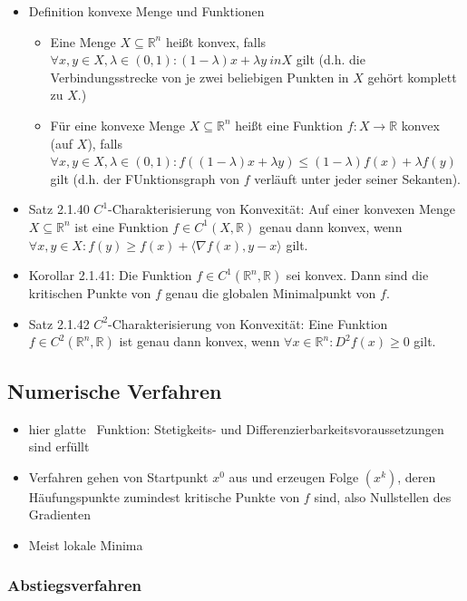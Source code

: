 \documentclass[paper=a4, fontsize=11pt]{scrartcl} %
\numberwithin{equation}{section} %
\numberwithin{figure}{section} %
\numberwithin{table}{section} %
\begin{document}
\begin{itemize}
\item Definition konvexe Menge und Funktionen
\begin{itemize}
\item Eine Menge $X \subseteq \mathbb{R}^n$ heißt konvex, falls $\forall x,y \in X, \lambda \in (0,1): (1-\lambda)x + \lambda y \ in X$ gilt (d.h. die Verbindungsstrecke von je zwei beliebigen Punkten in $X$ gehört komplett zu $X$.)
\item Für eine konvexe Menge $X \subseteq \mathbb{R}^n$ heißt eine Funktion $f: X \rightarrow \mathbb{R}$ konvex (auf $X$), falls $\forall x,y \in X, \lambda \in (0,1): f((1-\lambda)x+\lambda y) \le (1-\lambda)f(x) + \lambda f(y)$ gilt (d.h. der FUnktionsgraph von $f$ verläuft unter jeder seiner Sekanten).
\end{itemize}
\item Satz 2.1.40 $C^1$-Charakterisierung von Konvexität: Auf einer konvexen Menge $X \subseteq \mathbb{R}^n$ ist eine Funktion $f \in C^1(X,\mathbb{R})$ genau dann konvex, wenn $\forall x,y \in X: f(y) \ge f(x) + \langle \nabla f(x),y-x\rangle$ gilt.
\item Korollar 2.1.41: Die Funktion $f \in C^1(\mathbb{R}^n,\mathbb{R})$ sei konvex. Dann sind die kritischen Punkte von $f$ genau die globalen Minimalpunkt von $f$.
\item Satz 2.1.42 $C^2$-Charakterisierung von Konvexität: Eine Funktion $f \in C^2(\mathbb{R}^n,\mathbb{R})$ ist genau dann konvex, wenn $\forall x \in \mathbb{R}^n: D^2f(x) \ge 0$ gilt.
\end{itemize}

\subsection{Numerische Verfahren}

\begin{itemize}
\item hier \glqq glatte \grqq\ Funktion: Stetigkeits- und Differenzierbarkeitsvoraussetzungen sind erfüllt
\item Verfahren gehen von Startpunkt $x^0$ aus und erzeugen Folge $(x^k)$, deren Häufungspunkte zumindest kritische Punkte von $f$ sind, also Nullstellen des Gradienten
\item Meist lokale Minima
\end{itemize}

\subsubsection{Abstiegsverfahren}
\end{document}
